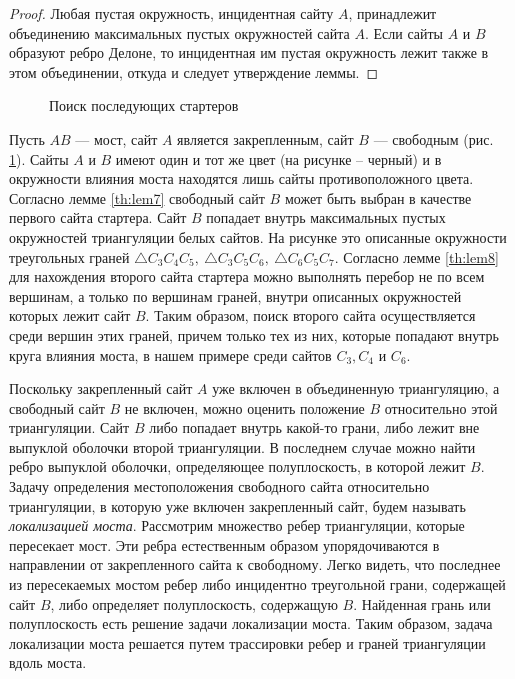 \documentclass[12pt]{article}
\begin{document}
\begin{proof}
Любая пустая окружность, инцидентная сайту $A$, принадлежит объединению максимальных пустых окружностей сайта $A$.
Если сайты $A$ и $B$ образуют ребро Делоне, то инцидентная им пустая окружность лежит также в этом объединении, откуда
и следует утверждение леммы.
\end{proof}

\begin{figure}[htb!]
	\caption{Поиск последующих стартеров}
	\label{pic:nextStarter}
\end{figure}

Пусть $AB$ --- мост, сайт $A$ является закрепленным, сайт $B$ --- свободным (рис. \ref{pic:nextStarter}).
Сайты $A$ и $B$ имеют один и тот же цвет (на рисунке – черный) и в окружности влияния моста находятся лишь сайты противоположного цвета.
Согласно лемме \ref{th:lem7} свободный сайт $B$ может быть выбран в качестве первого сайта стартера.
Сайт $B$ попадает внутрь максимальных пустых окружностей триангуляции белых сайтов.
На рисунке это описанные окружности треугольных граней $\triangle C_3C_4C_5,~\triangle C_3C_5C_6,~\triangle C_6C_5C_7$.
Согласно лемме \ref{th:lem8} для нахождения второго сайта стартера можно выполнять перебор не по всем вершинам,
а только по вершинам граней, внутри описанных окружностей которых лежит сайт $B$.
Таким образом, поиск второго сайта осуществляется среди вершин этих граней,
причем только тех из них, которые попадают внутрь круга влияния моста,
в нашем примере среди сайтов $C_3, C_4$ и $C_6$.

Поскольку закрепленный сайт $A$ уже включен в объединенную триангуляцию,
а свободный сайт $B$ не включен, можно оценить положение $B$ относительно этой триангуляции.
Сайт $B$ либо попадает внутрь какой-то грани, либо лежит вне выпуклой оболочки второй триангуляции.
В последнем случае можно найти ребро выпуклой оболочки, определяющее полуплоскость, в которой лежит $B$.
Задачу определения местоположения свободного сайта относительно триангуляции,
в которую уже включен закрепленный сайт, будем называть {\itshape локализацией моста}.
Рассмотрим множество ребер триангуляции, которые пересекает мост.
Эти ребра естественным образом упорядочиваются в направлении от закрепленного сайта к свободному.
Легко видеть, что последнее из пересекаемых мостом ребер либо инцидентно треугольной грани,
содержащей сайт $B$, либо определяет полуплоскость, содержащую $B$.
Найденная грань или полуплоскость есть решение задачи локализации моста.
Таким образом, задача локализации моста решается путем трассировки ребер и граней триангуляции вдоль моста.
\end{document}
